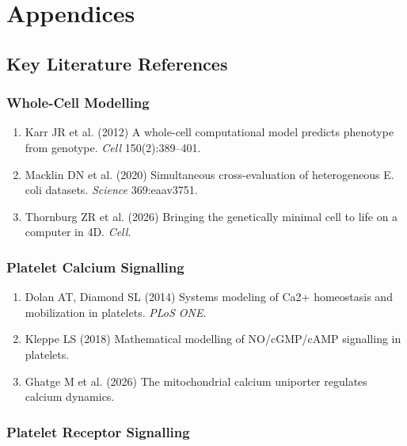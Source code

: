 \documentclass[11pt,a4paper]{report}
\begin{document}
\part{Appendices}

\appendix

\chapter{Key Literature References}

\section{Whole-Cell Modelling}

\begin{enumerate}
    \item Karr JR et al. (2012) A whole-cell computational model predicts phenotype from genotype. \emph{Cell} 150(2):389--401.
    \item Macklin DN et al. (2020) Simultaneous cross-evaluation of heterogeneous E. coli datasets. \emph{Science} 369:eaav3751.
    \item Thornburg ZR et al. (2026) Bringing the genetically minimal cell to life on a computer in 4D. \emph{Cell}.
\end{enumerate}

\section{Platelet Calcium Signalling}

\begin{enumerate}
    \item Dolan AT, Diamond SL (2014) Systems modeling of Ca2+ homeostasis and mobilization in platelets. \emph{PLoS ONE}.
    \item Kleppe LS (2018) Mathematical modelling of NO/cGMP/cAMP signalling in platelets.
    \item Ghatge M et al. (2026) The mitochondrial calcium uniporter regulates calcium dynamics. 
\end{enumerate}

\section{Platelet Receptor Signalling}
\end{document}
